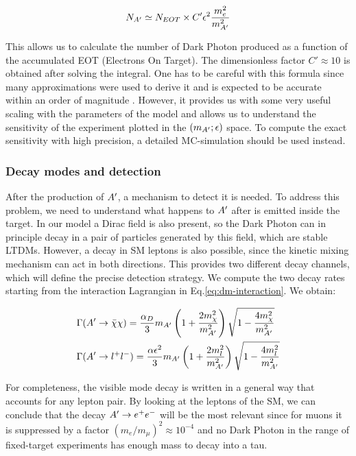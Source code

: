 \begin{equation}
  \label{eq:dm-rate}
  N_{A'} \simeq N_{EOT} \times C' \epsilon^2 \frac{m_e^2}{m^2_{A'}}
\end{equation}

This allows us to calculate the number of Dark Photon produced as a function of the accumulated EOT (Electrons On Target). The dimensionless factor $C' \approx 10$ is obtained after solving the integral. One has to be careful with this formula since many approximations were used to derive it and is expected to be accurate within an order of magnitude \cite{jdb}. However, it provides us with some very useful scaling with the parameters of the model and allows us to understand the sensitivity of the experiment plotted in the $(m_{A'};\epsilon)$ space. To compute the exact sensitivity with high precision, a detailed MC-simulation should be used instead.

\subsubsection{Decay modes and detection}
\label{ch1:sec:dm-decay}

After the production of $A'$, a mechanism to detect it is needed. To address this problem, we need to understand what happens to $A'$ after is emitted inside the target. In our model a Dirac field is also present, so the Dark Photon can in principle decay in a pair of particles generated by this field, which are stable LTDMs. However, a decay in SM leptons is also possible, since the kinetic mixing mechanism can act in both directions. This provides two different decay channels, which will define the precise detection strategy. We compute the two decay rates starting from the interaction Lagrangian in Eq.\ref{eq:dm-interaction}. We obtain:

\begin{equation}
  \label{eq:dm-bratio}
  \begin{aligned}
    &\Gamma(A' \to \bar{\chi} \chi) = \frac{\alpha_D}{3} m_{A'} \left( 1 + \frac{2m^2_{\chi}}{m_{A'}^2}\right) \sqrt{1 - \frac{4m_{\chi}^2}{m^2_{A'}}}\\
    &\Gamma(A' \to l^+l^-) = \frac{\alpha \epsilon^2}{3} m_{A'} \left( 1 + \frac{2m^2_{l}}{m_{A'}^2}\right) \sqrt{1 - \frac{4m_{l}^2}{m^2_{A'}}}
  \end{aligned}
\end{equation}

For completeness, the visible mode decay is written in a general way that accounts for any lepton pair. By looking at the leptons of the SM, we can conclude that the decay $A' \to e^+e^-$ will be the most relevant since for muons it is suppressed by a factor $(m_e/m_{\mu})^2 \approx 10^{-4}$ and no Dark Photon in the range of fixed-target experiments has enough mass to decay into a tau.

